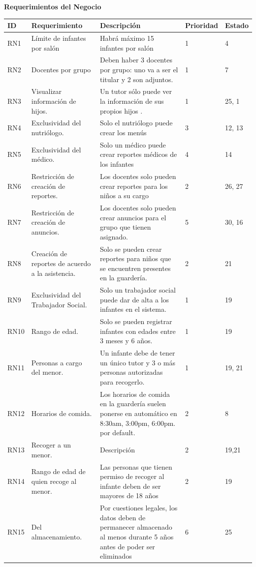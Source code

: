 \documentclass{article}
\begin{document}
\textbf{Requerimientos del Negocio} \\
	\begin{longtable}{|p{1.0cm}|p{3.0cm}|p{5.0cm}|p{1.2cm}|p{0.75cm}|}
	\hline
	\textbf{ID} & \textbf{Requerimiento} & \textbf{Descripción} & \textbf{Prioridad} & \textbf{Estado} \\
	\hline
	RN1 & Límite de infantes por salón & Habrá máximo 15 infantes por salón & 1 & 4 \\
	\hline
	RN2 & Docentes por grupo & Deben haber 3 docentes por grupo: uno va a ser el titular y 2 son adjuntos. & 1 & 7 \\
	\hline
	RN3 & Visualizar información de hijos. & Un tutor sólo puede ver la información de sus propios hijos . & 1 & 25, 1 \\
	\hline
	RN4 & Exclusividad del nutriólogo. & Solo el nutriólogo puede crear los menús & 3 & 12, 13 \\
	\hline
	RN5 & Exclusividad del médico.  & Solo un médico puede crear reportes médicos de los infantes & 4 & 14 \\
	\hline
	RN6 & Restricción de creación de reportes. & Los docentes solo pueden crear reportes para los niños a su cargo & 2 & 26, 27 \\
	\hline
	RN7 & Restricción de creación de anuncios. & Los docentes solo pueden crear anuncios para el grupo que tienen asignado. & 5 & 30, 16 \\
	\hline
	RN8 & Creación de reportes de acuerdo a la asistencia. & Solo se pueden crear reportes para niños que se encuentren presentes en la guardería. & 2 & 21 \\
	\hline
	RN9 & Exclusividad del Trabajador Social. & Solo un trabajador social puede dar de alta a los infantes en el sistema. & 1 & 19 \\
	\hline
	RN10 & Rango de edad. & Solo se pueden registrar infantes con edades entre 3 meses y 6 años. & 1 & 19 \\
	\hline
	RN11 & Personas a cargo del menor. & Un infante debe de tener un único tutor y 3 o más personas autorizadas para recogerlo. & 1 & 19, 21 \\
	\hline
	RN12 & Horarios de comida. & Los horarios de comida en la guardería suelen ponerse en automático en 8:30am, 3:00pm, 6:00pm. por default. & 2 & 8 \\
	\hline
	RN13 & Recoger a un menor.  & Descripción & 2 & 19,21 \\
	\hline
	RN14 & Rango de edad de quien recoge al menor. & Las personas que tienen permiso de recoger al infante deben de ser mayores de 18 años  & 2 & 19 \\
	\hline
	RN15 & Del almacenamiento. & Por cuestiones legales, los datos deben de permanecer almacenado al menos durante 5 años antes de poder ser eliminados & 6 & 25 \\
	\hline
	\end{longtable}
\end{document}
